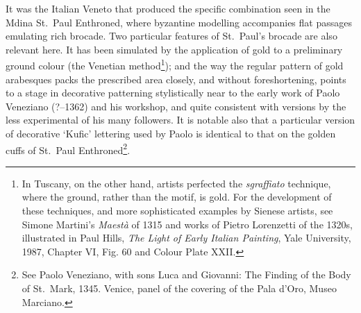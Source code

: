 \documentclass[a4paper,12pt]{article}
\begin{document}
It was the Italian Veneto that produced the specific combination seen
in the Mdina St.~Paul Enthroned, where byzantine modelling accompanies
flat passages emulating rich brocade. Two particular features of
St.~Paul's brocade are also relevant here.  It has been simulated by
the application of gold to a preliminary ground colour (the Venetian
method\footnote{In Tuscany, on the other hand, artists perfected the
\textit{sgraffiato} technique, where the ground, rather than the
motif, is gold. For the development of these techniques, and more
sophisticated examples by Sienese artists, see Simone Martini's
\textit{Maest\`a} of 1315 and works of Pietro Lorenzetti of the 1320s,
illustrated in Paul Hills, \textit{The Light of Early Italian
Painting}, Yale University, 1987, Chapter VI, Fig. 60 and Colour Plate
XXII.}); and the way the regular pattern of gold arabesques packs the
prescribed area closely, and without foreshortening, points to a stage
in decorative patterning stylistically near to the early work of Paolo
Veneziano (?--1362) and his workshop, and quite consistent with
versions by the less experimental of his many followers. It is notable
also that a particular version of decorative `Kufic' lettering used by
Paolo is identical to that on the golden cuffs of St.~Paul
Enthroned\footnote{See Paolo Veneziano, with sons Luca and Giovanni:
The Finding of the Body of St.~Mark, 1345. Venice, panel of the
covering of the Pala d'Oro, Museo Marciano.}.
\end{document}
